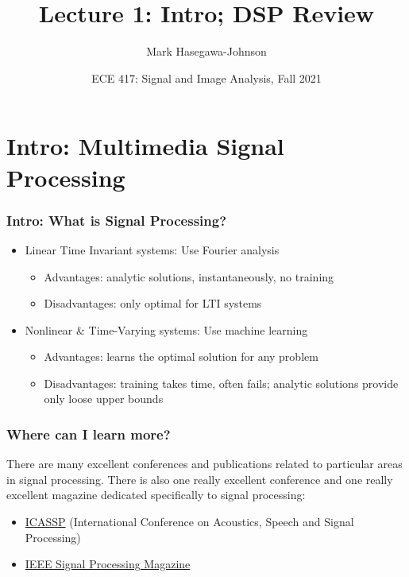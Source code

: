 \documentclass{beamer}
\title{Lecture 1: Intro; DSP Review}
\author{Mark Hasegawa-Johnson}
\date{ECE 417: Signal and Image Analysis, Fall 2021}
\begin{document}
\begin{frame}
  \maketitle
\end{frame}

\begin{frame}
  \tableofcontents
\end{frame}

\section[Intro]{Intro: Multimedia  Signal Processing}
\setcounter{subsection}{1}

\begin{frame}
  \frametitle{Intro: What is Signal Processing?}

  \begin{itemize}
  \item Linear Time Invariant systems: Use Fourier analysis
    \begin{itemize}
      \item Advantages: analytic solutions, instantaneously, no training
      \item Disadvantages: only optimal for LTI systems
    \end{itemize}
  \item Nonlinear \& Time-Varying systems: Use machine learning
    \begin{itemize}
    \item Advantages: learns the optimal solution for any problem
    \item Disadvantages: training takes time, often fails; analytic solutions provide only loose
      upper bounds
    \end{itemize}
  \end{itemize}

\end{frame}

\begin{frame}
  \frametitle{Where can I learn more?}

  There are many excellent conferences and publications  related to particular
  areas in signal processing.  There is also one really excellent conference
  and one really excellent magazine dedicated specifically to signal processing:
  \begin{itemize}
  \item \href{https://2022.ieeeicassp.org/}{ICASSP} (International
    Conference on Acoustics, Speech and Signal Processing)
  \item \href{https://signalprocessingsociety.org/publications-resources/ieee-signal-processing-magazine}{IEEE Signal Processing Magazine}
  \end{itemize}
\end{frame}
\end{document}

